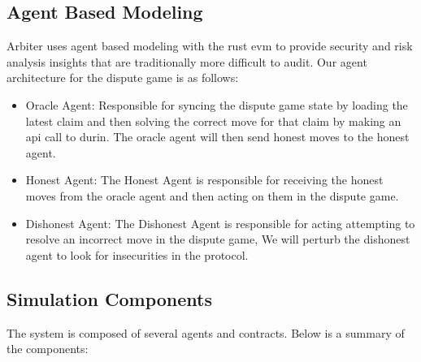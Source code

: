 \subsection{Agent Based Modeling}\label{agent-based-modeling}

Arbiter uses agent based modeling with the rust evm to provide security
and risk analysis insights that are traditionally more difficult to
audit. Our agent architecture for the dispute game is as follows:

\begin{itemize}
\tightlist
\item
  Oracle Agent: Responsible for syncing the dispute game state by
  loading the latest claim and then solving the correct move for that
  claim by making an api call to durin. The oracle agent will then send
  honest moves to the honest agent.
\item
  Honest Agent: The Honest Agent is responsible for receiving the honest
  moves from the oracle agent and then acting on them in the dispute
  game.
\item
  Dishonest Agent: The Dishonest Agent is responsible for acting
  attempting to resolve an incorrect move in the dispute game, We will
  perturb the dishonest agent to look for insecurities in the protocol.
\end{itemize}

\subsection{Simulation Components}\label{simulation-components}

The system is composed of several agents and contracts. Below is a summary of the components:

